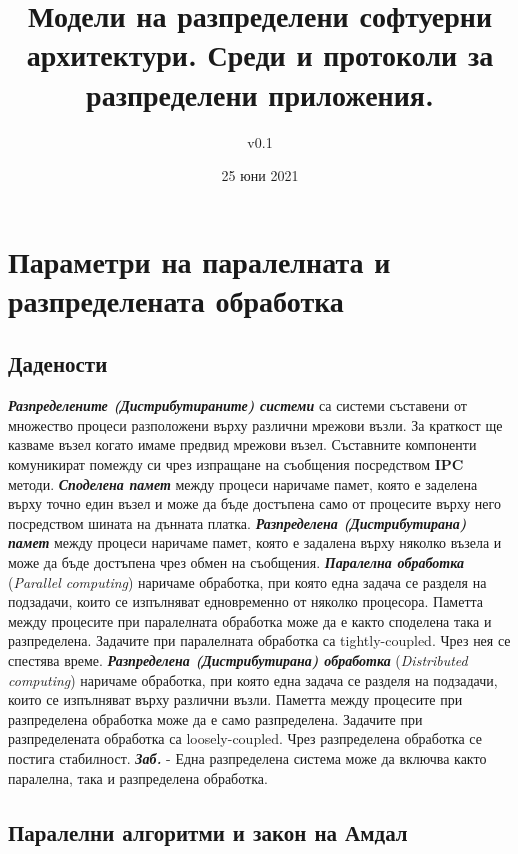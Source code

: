 \documentclass[fleqn,12pt]{article}
\title{Модели на разпределени софтуерни архитектури. Среди и протоколи за разпределени приложения.}
\author{v0.1}
\date{25 юни 2021}
\begin{document}
\maketitle
\tableofcontents
\pagebreak

\section{Параметри на паралелната и разпределената обработка}

\subsection{Дадености}

\textbf{\textit{Разпределените (Дистрибутираните) системи}} са системи съставени от множество процеси разположени върху различни мрежови възли.
За краткост ще казваме възел когато имаме предвид мрежови възел.
Съставните компоненти комуникират помежду си чрез изпращане на съобщения посредством \textbf{IPC} методи.
\bigbreak
\textbf{\textit{Споделена памет}} между процеси наричаме памет, която е заделена върху точно един възел и може да бъде достъпена само от процесите върху него посредством шината на дънната платка.
\bigbreak
\textbf{\textit{Разпределена (Дистрибутирана) памет}} между процеси наричаме памет, която е задалена върху няколко възела и може да бъде достъпена чрез обмен на съобщения.
\bigbreak
\textbf{\textit{Паралелна обработка}} (\textit{Parallel computing}) наричаме обработка, при която една задача се разделя на подзадачи, които се изпълняват едновременно от няколко процесора.
Паметта между процесите при паралелната обработка може да е както споделена така и разпределена.
Задачите при паралелната обработка са tightly-coupled.
Чрез нея се спестява време.
\bigbreak
\textbf{\textit{Разпределена (Дистрибутирана) обработка}} (\textit{Distributed computing}) наричаме обработка, при която една задача се разделя на подзадачи, които се изпълняват върху различни възли.
Паметта между процесите при разпределена обработка може да е само разпределена.
Задачите при разпределената обработка са loosely-coupled.
Чрез разпределена обработка се постига стабилност.
\bigbreak
\textbf{\textit{Заб.}} - Една разпределена система може да включва както паралелна, така и разпределена обработка.

\subsection{Паралелни алгоритми и закон на Амдал}
\end{document}
